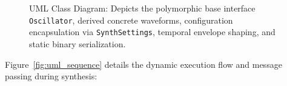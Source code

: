 \documentclass[12pt,a4paper,oneside]{book}
\begin{document}
\begin{figure}[htbp]
{
}
\caption{UML Class Diagram: Depicts the polymorphic base interface \texttt{Oscillator}, derived concrete waveforms, configuration encapsulation via \texttt{SynthSettings}, temporal envelope shaping, and static binary serialization.}
\label{fig:uml_class}
\end{figure}

Figure~\ref{fig:uml_sequence} details the dynamic execution flow and message passing during synthesis:
\end{document}
